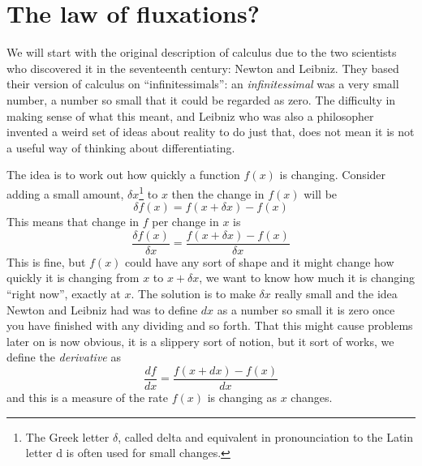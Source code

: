 \documentclass[12pt]{article}
\begin{document}
\section*{The law of fluxations?}

We will start with the original description of calculus due to the two
scientists who discovered it in the seventeenth century: Newton and
Leibniz. They based their version of calculus on ``infinitessimals'':
an \textsl{infinitessimal} was a very small number, a number so small
that it could be regarded as zero. The difficulty in making sense of
what this meant, and Leibniz who was also a philosopher invented a
weird set of ideas about reality to do just that, does not mean it is
not a useful way of thinking about differentiating.

The idea is to work out how quickly a function $f(x)$ is
changing. Consider adding a small amount, $\delta x$\footnote{The Greek letter $\delta$, called delta and equivalent in pronounciation to the Latin letter d is often used for small changes.} to $x$ then the change in $f(x)$ will be
\begin{equation}
  \delta f(x) = f(x+\delta x) - f(x)
\end{equation}
This means that change in $f$ per change in $x$ is
\begin{equation}
  \frac{\delta f(x)}{\delta x} = \frac{f(x+\delta x) - f(x)}{\delta x}
\end{equation}
This is fine, but $f(x)$ could have any sort of shape and it might
change how quickly it is changing from $x$ to $x+\delta x$, we want to
know how much it is changing ``right now'', exactly at $x$. The
solution is to make $\delta x$ really small and the idea Newton and
Leibniz had was to define $dx$ as a number so small it is zero once
you have finished with any dividing and so forth. That this might
cause problems later on is now obvious, it is a slippery sort of
notion, but it sort of works, we define the \textsl{derivative} as
\begin{equation}
  \frac{df}{dx}=\frac{f(x+dx)-f(x)}{dx}
\end{equation}
and this is a measure of the rate $f(x)$ is changing as $x$ changes.
\end{document}
